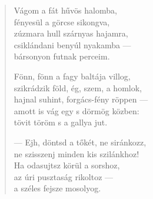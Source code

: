 \documentclass[11pt]{extbook}
\newcommand*{\centeredornament}{\centerline{\pgfornament[width=6cm]{88}}}
\begin{document}
\begin{verse}
  Vágom a fát hűvös halomba, \\
  fényesül a görcse sikongva, \\
  zúzmara hull szárnyas hajamra, \\
  csiklándani benyúl nyakamba --- \\
  bársonyon futnak perceim.

  Fönn, fönn a fagy baltája villog, \\
  szikrádzik föld, ég, szem, a homlok, \\
  hajnal suhint, forgács-fény röppen --- \\
  amott is vág egy s dörmög közben: \\
  tövit töröm s a gallya jut.

  --- Ejh, döntsd a tőkét, ne siránkozz, \\
  ne szisszenj minden kis szilánkhoz! \\
  Ha odasujtsz körül a sorshoz, \\
  az úri pusztaság rikoltoz --- \\
  a széles fejsze mosolyog.
\end{verse}

\newpage


\vspace*{-15mm}
\centeredornament



\end{document}
